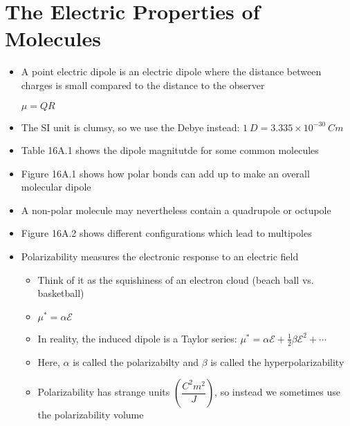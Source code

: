 \documentclass[12pt, openany, letterpaper]{memoir}
\begin{document}
\section{The Electric Properties of Molecules}
\begin{itemize}
	\item A point electric dipole is an electric dipole where the distance between charges is small compared to the distance to the observer
	
	$\mu = QR$
	\item The SI unit is clumsy, so we use the Debye instead: $1~D=3.335\times10^{-30}~Cm$
	\item Table 16A.1 shows the dipole magnitutde for some common molecules
	\item Figure 16A.1 shows how polar bonds can add up to make an overall molecular dipole
	\item A non-polar molecule may nevertheless contain a quadrupole or octupole
	\item Figure 16A.2 shows different configurations which lead to multipoles
	\item Polarizability measures the electronic response to an electric field
	\begin{itemize}
		\item Think of it as the squishiness of an electron cloud (beach ball vs. basketball)
		\item $\mu^* = \alpha\mathcal{E}$
		\item In reality, the induced dipole is a Taylor series: $\mu^* = \alpha\mathcal{E} + \frac{1}{2}\beta\mathcal{E}^2+\cdots$
		\item Here, $\alpha$ is called the polarizabilty and $\beta$ is called the hyperpolarizability
		\item Polarizability has strange units $\left(\dfrac{C^2m^2}{J}\right)$, so instead we sometimes use the polarizability volume
		

\end{itemize}
\end{itemize}
\end{document}
